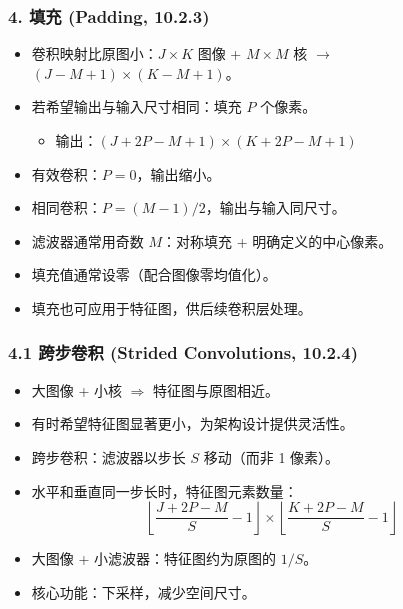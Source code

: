 \documentclass[t,aspectratio=169]{beamer} %
\begin{document}
\begin{frame}
    \frametitle{4. 填充 (Padding, 10.2.3)}
    \begin{itemize}
        \item 卷积映射比原图小：$J \times K$ 图像 + $M \times M$ 核 $\to$ $(J-M+1) \times (K-M+1)$。
        \item 若希望输出与输入\alert{尺寸相同}：填充 $P$ 个像素。
        \begin{itemize}
            \item 输出：$(J+2P-M+1) \times (K+2P-M+1)$
        \end{itemize}
        \item \alert{有效卷积}：$P = 0$，输出缩小。
        \item \alert{相同卷积}：$P = (M-1)/2$，输出与输入同尺寸。
        \item 滤波器通常用\alert{奇数} $M$：对称填充 + 明确定义的中心像素。
        \item 填充值通常设\alert{零}（配合图像零均值化）。
        \item 填充也可应用于特征图，供后续卷积层处理。
    \end{itemize}
\end{frame}

\begin{frame}
    \frametitle{4.1 跨步卷积 (Strided Convolutions, 10.2.4)}
    \begin{itemize}
        \item 大图像 + 小核 $\Rightarrow$ 特征图与原图相近。
        \item 有时希望特征图\alert{显著更小}，为架构设计提供灵活性。
        \item \alert{跨步卷积}：滤波器以步长 $S$ 移动（而非 1 像素）。
        \item 水平和垂直同一步长时，特征图元素数量：
        \begin{equation}
            \left\lfloor \frac{J + 2P - M}{S} - 1 \right\rfloor \times \left\lfloor \frac{K + 2P - M}{S} - 1 \right\rfloor
            \tag{10.5}
        \end{equation}
        \item 大图像 + 小滤波器：特征图约为原图的 $1/S$。
        \item 核心功能：\alert{下采样}，减少空间尺寸。
    \end{itemize}
\end{frame}

\end{document}
